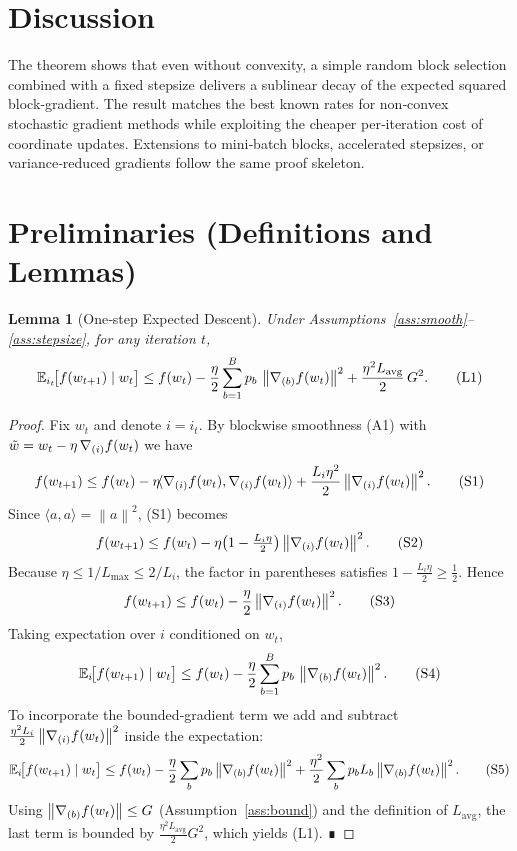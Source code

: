 \documentclass{article}
\newtheorem{lemma}{Lemma}
\newcommand{\E}{\mathbb{E}}
\newcommand{\norm}[1]{\left\|#1\right\|}
\newcommand{\grad}[1]{\nabla #1}
\begin{document}
\section*{Discussion}
The theorem shows that even without convexity, a simple random block
selection combined with a fixed stepsize delivers a sublinear decay of the
expected squared block‑gradient.  The result matches the best known rates for
non‑convex stochastic gradient methods while exploiting the cheaper
per‑iteration cost of coordinate updates.  Extensions to mini‑batch blocks,
accelerated stepsizes, or variance‑reduced gradients follow the same
proof skeleton.

\section*{Preliminaries (Definitions and Lemmas)}
\begin{lemma}[One‑step Expected Descent]\label{lem:descent}
Under Assumptions~\ref{ass:smooth}–\ref{ass:stepsize},
for any iteration $t$,
\[
\E_{i_{t}}\!\bigl[f(w_{t+1})\mid w_{t}\bigr]
\le f(w_{t})-\frac{\eta}{2}\sum_{b=1}^{B}p_{b}\,
\norm{\grad_{(b)}f(w_{t})}^{2}
+\frac{\eta^{2}L_{\mathrm{avg}}}{2}\,G^{2}.
\tag{L1}
\]
\end{lemma}
\begin{proof}
Fix $w_{t}$ and denote $i=i_{t}$.  By blockwise smoothness (A1) with
$\tilde w = w_{t} -\eta\,\grad_{(i)}f(w_{t})$ we have
\[
f(w_{t+1})\le
f(w_{t})-\eta\!\langle \grad_{(i)}f(w_{t}),\grad_{(i)}f(w_{t})\rangle
+\frac{L_{i}\eta^{2}}{2}\norm{\grad_{(i)}f(w_{t})}^{2}.
\tag{S1}
\]
Since $\langle a,a\rangle =\norm{a}^{2}$, (S1) becomes
\[
f(w_{t+1})\le
f(w_{t})-\eta\bigl(1-\tfrac{L_{i}\eta}{2}\bigr)
\norm{\grad_{(i)}f(w_{t})}^{2}.
\tag{S2}
\]
Because $\eta\le 1/L_{\max}\le 2/L_{i}$, the factor in parentheses satisfies
$1-\tfrac{L_{i}\eta}{2}\ge \tfrac12$.  Hence
\[
f(w_{t+1})\le
f(w_{t})-\frac{\eta}{2}\norm{\grad_{(i)}f(w_{t})}^{2}.
\tag{S3}
\]
Taking expectation over $i$ conditioned on $w_{t}$,
\[
\E_{i}\!\bigl[f(w_{t+1})\mid w_{t}\bigr]
\le f(w_{t})-\frac{\eta}{2}\sum_{b=1}^{B}p_{b}\,
\norm{\grad_{(b)}f(w_{t})}^{2}.
\tag{S4}
\]
To incorporate the bounded‑gradient term we add and subtract
$\frac{\eta^{2}L_{i}}{2}\norm{\grad_{(i)}f(w_{t})}^{2}$ inside the expectation:
\[
\E_{i}\!\bigl[f(w_{t+1})\mid w_{t}\bigr]
\le f(w_{t})-\frac{\eta}{2}\sum_{b}p_{b}\norm{\grad_{(b)}f(w_{t})}^{2}
+\frac{\eta^{2}}{2}\sum_{b}p_{b}L_{b}\norm{\grad_{(b)}f(w_{t})}^{2}.
\tag{S5}
\]
Using $\norm{\grad_{(b)}f(w_{t})}\le G$ (Assumption~\ref{ass:bound}) and the
definition of $L_{\mathrm{avg}}$, the last term is bounded by
$\frac{\eta^{2}L_{\mathrm{avg}}}{2}G^{2}$, which yields (L1).  ∎
\end{proof}
\end{document}
